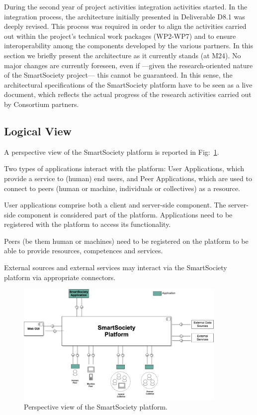 During the second year of project activities integration activities
started. In the integration process, the architecture initially
presented in Deliverable D8.1 was deeply revised. This process was
required in order to align the activities carried out within the
project's technical work packages (WP2-WP7) and to ensure
interoperability among the components developed by the various
partners. In this section we briefly present the architecture as it
currently stands (at M24). No major changes are currently foreseen,
even if ---given the research-oriented nature of the SmartSociety
project--- this cannot be guaranteed. In this sense, the architectural
specifications of the SmartSociety platform have to be seen as a live document, which reflects the
actual progress of the research activities carried out by Consortium
partners. 

\subsection{Logical View}
A perspective view of the SmartSociety platform is reported in
Fig:~\ref{fig:perspective}. 

Two types of applications interact with the platform: User
Applications, which provide a service to (human) end users, and Peer
Applications, which are used to connect to peers (human or machine,
individuals or collectives) as a resource. 

User applications comprise both a client and server-side
component. The server-side component is considered part of the
platform. Applications need to be registered with the platform to
access its functionality. 

Peers (be them human or machines) need to be registered on the
platform to be able to provide resources, competences and services. 

External sources and external services may interact via the
SmartSociety platform via appropriate connectors. 

\begin{figure}
\centering
\includegraphics[width=0.9\textwidth]{./figs/perspective_view}
\caption{Perspective view of the SmartSociety platform.}
\label{fig:perspective}
\end{figure}


